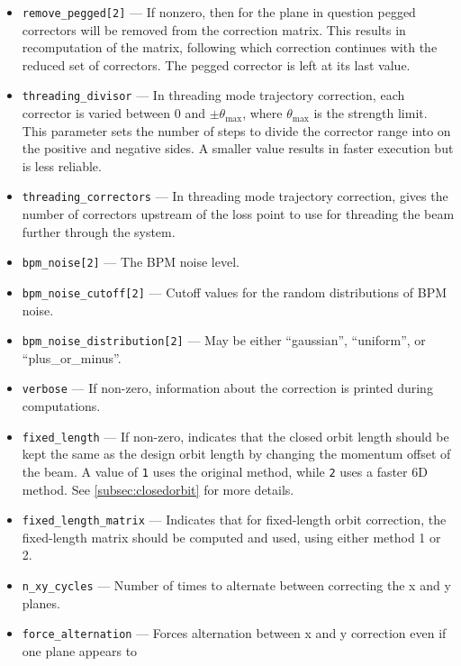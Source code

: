 \documentclass[11pt]{article}
\begin{document}
\begin{itemize}
  is zero or negative and \verb|Tikhonov_n| is greater than 0, the Tikhonov $\alpha$ parameter is set to the singular value
  of the indicated vector; e.g., using 10 means $\alpha$ is equal to the 11$^{th}$ largest singular value (indexing starts at zero).
  Can be used together with singular-value removal controls.
\item \verb|remove_pegged[2]| --- If nonzero, then for the plane in question pegged correctors will be removed from the correction matrix.
  This results in recomputation of the matrix, following which correction continues with the reduced set of correctors.
  The pegged corrector is left at its last value.
\item \verb|threading_divisor| --- In threading mode trajectory correction, each corrector is varied between 0 and $\pm{\theta_{\textrm{max}}}$, 
  where $\theta_{\textrm{max}}$ is the strength limit.
  This parameter sets the number of steps to divide the corrector range into on the positive and negative sides.
  A smaller value results in faster execution but is less reliable.
\item \verb|threading_correctors| --- In threading mode trajectory correction, gives the number of correctors upstream of the loss point to
  use for threading the beam further through the system.
\item \verb|bpm_noise[2]| --- The BPM noise level. 
\item \verb|bpm_noise_cutoff[2]| --- Cutoff values for the random distributions of BPM noise.
\item \verb|bpm_noise_distribution[2]| --- May be either ``gaussian'', ``uniform'', or ``plus\_or\_minus''.
\item \verb|verbose| --- If non-zero, information about the correction is printed during computations.
\item \verb|fixed_length| --- If non-zero, indicates that the closed orbit length should be kept the same as the design orbit
  length by changing the momentum offset of the beam. A value of \verb|1| uses the original method, while \verb|2| uses
  a faster 6D method. See \ref{subsec:closedorbit} for more details.
\item \verb|fixed_length_matrix| --- Indicates that for fixed-length orbit correction, the fixed-length
matrix should be computed and used, using either method 1 or 2.
\item \verb|n_xy_cycles| --- Number of times to alternate between correcting the x and y planes.
\item \verb|force_alternation| --- Forces alternation between x and y correction even if one plane appears to 

\end{itemize}
\end{document}
